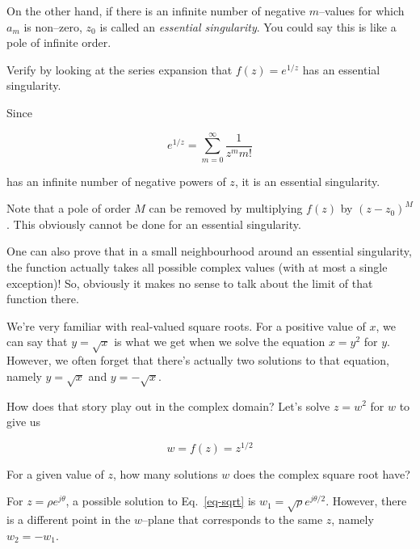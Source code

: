 On the other hand, if there is an infinite number of negative $m$--values for which $a_m$ is non--zero, $z_0$ is called an \emph{essential singularity}. You could say this is like a pole of infinite order.

\begin{cue}
  Verify by looking at the series expansion that $f(z)=e^{1/z}$ has an essential singularity.  
\end{cue}

Since

$$e^{1/z} = \sum_{m=0}^{\infty} \frac{1}{z^m m!} $$

has an infinite number of negative powers of $z$, it is an essential singularity.

Note that a pole of order $M$ can be removed by multiplying $f(z)$ by $(z-z_0)^M$. This obviously cannot be done for an essential singularity.

\noindent{}One can also prove that in a small neighbourhood around an essential singularity, the function actually takes all possible complex values (with at most a single exception)! So, obviously it makes no sense to talk about the limit of that function there.


We're very familiar with real-valued square roots. For a positive value of $x$, we can say that $y = \sqrt{x}$ is what we get when we solve the equation $x=y^2$ for $y$. However, we often forget that there's actually two solutions to that equation, namely $y = \sqrt{x}$ and $y = -\sqrt{x}$.

\noindent{}How does that story play out in the complex domain? Let's solve $z=w^2$ for $w$ to give us

\begin{equation}
w = f(z) = z^{1/2} \label{eq-sqrt}
\end{equation}

\begin{cue}
For a given value of $z$, how many solutions $w$ does the complex square root have? 
\end{cue}

For $z=\rho e^{j\theta}$, a possible solution to Eq.~\ref{eq-sqrt} is $w_1 = \sqrt{\rho} e^{j\theta/2}$. However, there is a different point in the $w$--plane that corresponds to the same $z$, namely  $w_2=-w_1$. 


